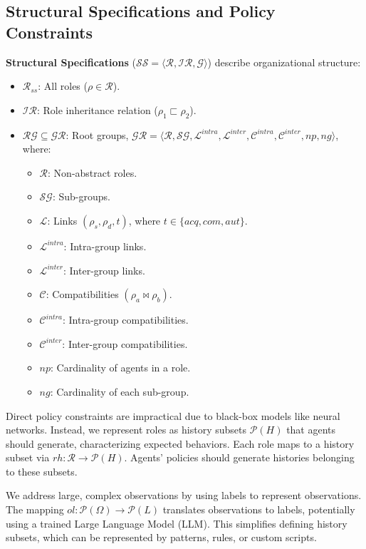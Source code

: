 \documentclass[conference]{IEEEtran}
\newcounter{relation}
\begin{document}
\subsection{Structural Specifications and Policy Constraints}

\textbf{Structural Specifications} ($\mathcal{SS} = \langle \mathcal{R}, \mathcal{IR}, \mathcal{G} \rangle$) describe organizational structure:
\begin{itemize}
    \item $\mathcal{R}_{ss}$: All roles ($\rho \in \mathcal{R}$).
    \item $\mathcal{IR}$: Role inheritance relation ($\rho_1 \sqsubset \rho_2$).
    \item $\mathcal{RG} \subseteq \mathcal{GR}$: Root groups, $\mathcal{GR} = \langle \mathcal{R}, \mathcal{SG}, \mathcal{L}^{intra}, \mathcal{L}^{inter}, \mathcal{C}^{intra}, \mathcal{C}^{inter}, np, ng \rangle$, where:
    \begin{itemize}
        \item $\mathcal{R}$: Non-abstract roles.
        \item $\mathcal{SG}$: Sub-groups.
        \item $\mathcal{L}$: Links $(\rho_s, \rho_d, t)$, where $t \in \{acq, com, aut\}$.
        \item $\mathcal{L}^{intra}$: Intra-group links.
        \item $\mathcal{L}^{inter}$: Inter-group links.
        \item $\mathcal{C}$: Compatibilities $(\rho_a \bowtie \rho_b)$.
        \item $\mathcal{C}^{intra}$: Intra-group compatibilities.
        \item $\mathcal{C}^{inter}$: Inter-group compatibilities.
        \item $np$: Cardinality of agents in a role.
        \item $ng$: Cardinality of each sub-group.
    \end{itemize}
\end{itemize}

Direct policy constraints are impractical due to black-box models like neural networks. Instead, we represent roles as history subsets $\mathcal{P}(H)$ that agents should generate, characterizing expected behaviors. Each role maps to a history subset via $rh: \mathcal{R} \rightarrow \mathcal{P}(H)$. Agents' policies should generate histories belonging to these subsets.

We address large, complex observations by using labels to represent observations. The mapping $ol: \mathcal{P}(\Omega) \rightarrow \mathcal{P}(L)$ translates observations to labels, potentially using a trained Large Language Model (LLM). This simplifies defining history subsets, which can be represented by patterns, rules, or custom scripts.
\end{document}
